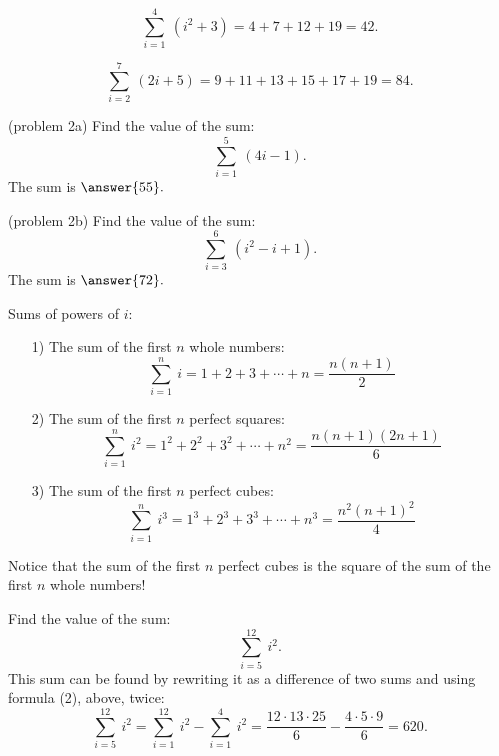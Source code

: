 \documentclass[handout]{ximera}
\begin{document}
\begin{example}[example 1]
\[\sum_{i = 1}^4 \ (i^2 + 3) = 4 + 7 + 12 + 19 = 42.\]
\end{example}

\begin{example}[example 2]
\[\sum_{i = 2}^7 \ (2i +5) = 9 + 11 + 13 + 15 + 17 + 19 = 84.\]
\end{example}

\begin{problem}(problem 2a)
Find the value of the sum:
\[\sum_{i = 1}^5 \ (4i -1).\]
The sum is $\answer{55}.$
\end{problem}

\begin{problem}(problem 2b)
Find the value of the sum:
\[\sum_{i = 3}^6 \ (i^2 - i + 1).\]
The sum is $\answer{72}.$
\end{problem}


\begin{theorem} Sums of powers of $i$:



\begin{enumerate}
\item[1)] The sum of the first $n$ whole numbers:
\[
\sum_{i = 1}^n \ i = 1 + 2 + 3+ \cdots + n = \frac{n(n+1)}{2}
\]
\item[2)] The sum of the first $n$ perfect squares:
\[
\sum_{i = 1}^n \ i^2 = 1^2 + 2^2 + 3^2 + \cdots + n^2 = \frac{n(n+1)(2n+1)}{6}
\]
\item[3)] The sum of the first $n$ perfect cubes:
\[
\sum_{i = 1}^n \ i^3 = 1^3 + 2^3+ 3^3 + \cdots + n^3 = \frac{n^2(n+1)^2}{4}
\]
\end{enumerate}
\end{theorem}

\begin{remark}
Notice that the sum of the first $n$ perfect cubes is the square of the sum of the 
first $n$ whole numbers!
\end{remark}

\begin{example}[example 3]
Find the value of the sum:
\[\sum_{i = 5}^{12} \ i^2.\]
This sum can be found by rewriting it as a difference of two sums and using formula (2), above, twice:
 \[\sum_{i = 5}^{12} \ i^2 = \sum_{i = 1}^{12}\ i^2 - \sum_{i = 1}^{4} \ i^2 = \frac{12\cdot 13\cdot 25}{6} - \frac{4\cdot 5\cdot 9}{6} = 620. \]
\end{example}
\end{document}
